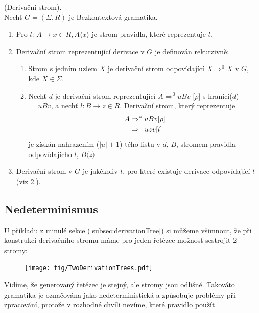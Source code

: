 \begin{defn}
  (Derivační strom). \cite[str. 92]{MedunaIFJ}\\
  Nechť $G = (\Sigma, R)$ je Bezkontextová gramatika.\\
  \begin{enumerate}
    \item Pro $l$: $A \rightarrow x \in R, A\langle x\rangle$ je strom pravidla, které reprezentuje $l$.
    \item Derivační strom reprezentující derivace v $G$ je definován rekurzivně:
    \begin{enumerate}
      \item Strom s jedním uzlem $X$ je derivační strom odpovídající $X \Rightarrow^0 X$ v $G$, kde $X \in \Sigma$.
      \item Nechť $d$ je derivační strom reprezentující
            $A \Rightarrow^0 uBv$ [$\rho$] s hranicí($d$) $ = uBv$, a nechť $l: B \rightarrow z \in R$.
            Derivační strom, který reprezentuje
            \begin{align}
                A & \Rightarrow^* uBv [\rho] \nonumber\\
                  & \Rightarrow \hphantom{*} uzv [l] \nonumber
            \end{align}
            je získán nahrazením ($|u|+1$)-tého listu v $d$, $B$, stromem pravidla odpovídajícho $l$, $B\langle z\rangle$
    \end{enumerate}
    \item Derivační strom v $G$ je jakékoliv $t$, pro které existuje derivace odpovídající $t$ (viz 2.).
  \end{enumerate}
  \vspace{-0.2cm}
\end{defn}

\subsection{Nedeterminismus}
\label{subec:nondeterminsm}

U příkladu z minulé sekce (\ref{subsec:derivationTree}) si můžeme všimnout,
že při konstrukci derivačního stromu máme pro jeden řetězec možnost sestrojit
2 stromy:

\begin{figure}[H]
  \centering
  \texttt{[image: fig/TwoDerivationTrees.pdf]}
\end{figure}

Vidíme, že generovaný řetězec je stejný, ale stromy jsou odlišné.
Takováto gramatika je označována jako nedeterministická a způsobuje problémy při
zpracování, protože v rozhodné chvíli nevíme, které pravidlo použít.\\

